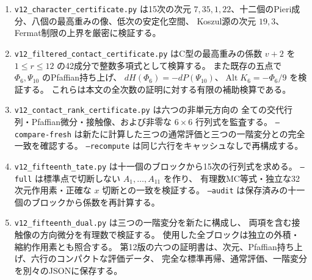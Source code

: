 \begin{enumerate}
 \item \texttt{v12\_character\_certificate.py} は15次の次元
 $7,35,1,22$、十二個のPieri成分、八個の最高重みの像、低次の安定化空間、
 Koszul源の次元 $19,3$、Fermat制限の上界を厳密に検証する。
 \item \texttt{v12\_filtered\_contact\_certificate.py} はC型の最高重みの係数
 $v+2$ を $1\le r\le12$ の42成分で整数多項式として検算する。
 また既存の五点で $\Phi_6,\Psi_{10}$ のPfaffian持ち上げ、
 $dH(\Phi_6)=-dP(\Psi_{10})$、$\operatorname{Alt}K_6=-\Phi_6/9$ を検証する。
 これらは本文の全次数の証明に対する有限の補助検算である。
 \item \texttt{v12\_contact\_rank\_certificate.py} は六つの非単元方向の
 全ての交代行列・Pfaffian微分・接触像、および非零な $6\times6$ 行列式を監査する。
 \texttt{--compare-fresh} は新たに計算した三つの通常評価と三つの一階変分との完全一致を確認する。
 \texttt{--recompute} は同じ六行をキャッシュなしで再構成する。
 \item \texttt{v12\_fifteenth\_tate.py} は十一個のブロックから15次の行列式を求める。
 \texttt{--full} は標準点で切断しない $A_1,\ldots,A_{11}$ を作り、
 有理数MC等式・独立な32次元作用素・正確な $x$ 切断との一致を検証する。
 \texttt{--audit} は保存済みの十一個のブロックから係数を再計算する。
 \item \texttt{v12\_fifteenth\_dual.py} は三つの一階変分を新たに構成し、
 両項を含む接触像の方向微分を有理数で検証する。
 使用した全ブロックは独立の外積・縮約作用素とも照合する。
 第12版の六つの証明書は、次元、Pfaffian持ち上げ、六行のコンパクトな評価データ、
 完全な標準再帰、通常評価、一階変分を別々のJSONに保存する。


\end{enumerate}
